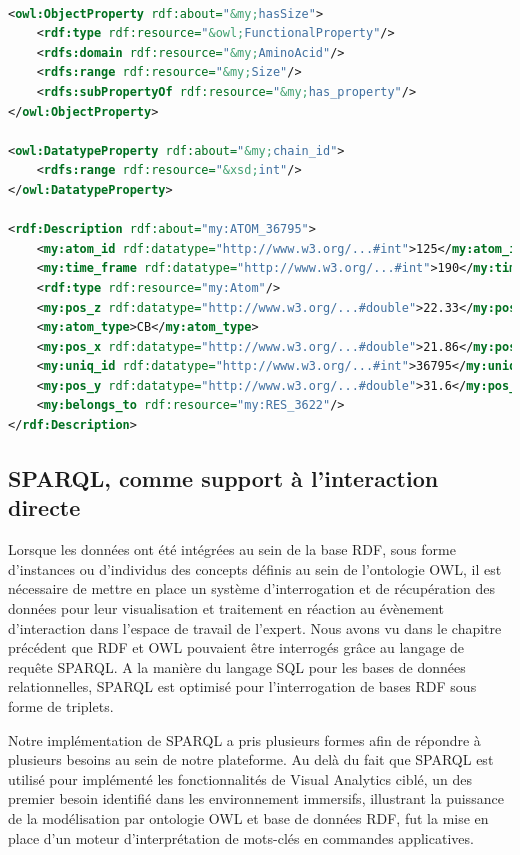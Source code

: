 \begin{lstlisting}[language=XML, caption=Exemple de triplets RDF présents dans notre base de données, label=rdf_xml]

<owl:ObjectProperty rdf:about="&my;hasSize">
    <rdf:type rdf:resource="&owl;FunctionalProperty"/>
    <rdfs:domain rdf:resource="&my;AminoAcid"/>
    <rdfs:range rdf:resource="&my;Size"/>
    <rdfs:subPropertyOf rdf:resource="&my;has_property"/>
</owl:ObjectProperty>

<owl:DatatypeProperty rdf:about="&my;chain_id">
    <rdfs:range rdf:resource="&xsd;int"/>
</owl:DatatypeProperty>

<rdf:Description rdf:about="my:ATOM_36795">
	<my:atom_id rdf:datatype="http://www.w3.org/...#int">125</my:atom_id>
	<my:time_frame rdf:datatype="http://www.w3.org/...#int">190</my:time_frame>
	<rdf:type rdf:resource="my:Atom"/>
	<my:pos_z rdf:datatype="http://www.w3.org/...#double">22.33</my:pos_z>
	<my:atom_type>CB</my:atom_type>
	<my:pos_x rdf:datatype="http://www.w3.org/...#double">21.86</my:pos_x>
	<my:uniq_id rdf:datatype="http://www.w3.org/...#int">36795</my:uniq_id>
	<my:pos_y rdf:datatype="http://www.w3.org/...#double">31.6</my:pos_y>
	<my:belongs_to rdf:resource="my:RES_3622"/>
</rdf:Description>

\end{lstlisting}

\subsection{SPARQL, comme support à l'interaction directe} \label{sparql_interpretation_engine}

Lorsque les données ont été intégrées au sein de la base RDF, sous forme d'instances ou d'individus des concepts définis au sein de l'ontologie OWL, il est nécessaire de mettre en place un système d'interrogation et de récupération des données pour leur visualisation et traitement en réaction au évènement d'interaction dans l'espace de travail de l'expert. Nous avons vu dans le chapitre précédent que RDF et OWL pouvaient être interrogés grâce au langage de requête SPARQL. A la manière du langage SQL pour les bases de données relationnelles, SPARQL est optimisé pour l'interrogation de bases RDF sous forme de triplets.

Notre implémentation de SPARQL a pris plusieurs formes afin de répondre à plusieurs besoins au sein de notre plateforme. Au delà du fait que SPARQL est utilisé pour implémenté les fonctionnalités de Visual Analytics ciblé, un des premier besoin identifié dans les environnement immersifs, illustrant la puissance de la modélisation par ontologie OWL et base de données RDF, fut la mise en place d'un moteur d'interprétation de mots-clés en commandes applicatives.

